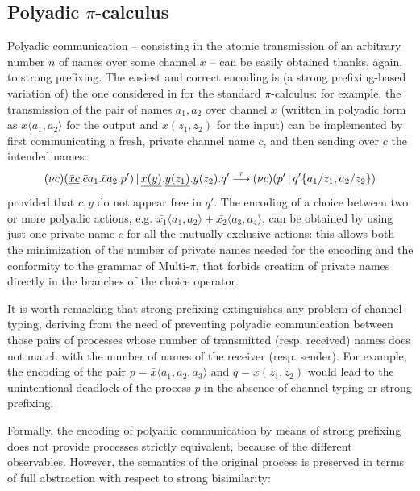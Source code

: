 \documentclass[submission,copyright,creativecommons]{eptcs}
\newcommand{\deriv}[1]{{\mbox{${\:\stackrel{#1}{\longrightarrow}\:}$}}}
\newcommand{\restr}[1]{\mbox{$({\bf\nu} #1)$}}
\newcommand{\para}{\mbox{$\,|\,$}}
\begin{document}
\subsection{Polyadic $\pi$-calculus}
Polyadic communication -- consisting in the atomic transmission of an arbitrary number $n$ of names over some channel $x$ --
can be easily obtained thanks, again, to strong prefixing. The easiest and correct encoding is (a strong prefixing-based variation of) 
the one considered in \cite{Mil91}
for the standard $\pi$-calculus: for example, the transmission of the pair of names $a_1, a_2$ over channel $x$ (written in polyadic
form as $\bar{x} \langle a_1,a_2 \rangle$ for the output and $x(z_1,z_2)$ for the input) can be implemented by first communicating a fresh, private channel name $c$, and then sending over $c$ the intended names:
\[ \restr{c} (\underline{\bar{x}c}.\underline{\bar{c}a_1}.\bar{c}a_2.p') \para
			 \underline{x(y)}.\underline{y(z_1)}.y(z_2).q' \deriv{\tau} \restr{c} (p' \para q'\{a_1/z_1,a_2/z_2\}) \]
provided that $c, y$ do not appear free in $q'$. The encoding of a choice between two or more polyadic actions, 
e.g. $\bar{x_1} \langle a_1,a_2 \rangle + \bar{x_2} \langle a_3,a_4 \rangle$, can be obtained by using just one 
private name $c$ for all the mutually exclusive actions: this allows both the minimization of the number 
of private names needed for the encoding and the conformity to the grammar of Multi-$\pi$, that forbids creation 
of private names directly in the branches of the choice operator.

It is worth remarking that strong prefixing extinguishes any problem of channel typing, deriving from the need of preventing polyadic 
communication between those pairs of processes whose number of transmitted (resp. received) names does not match with the number
of names of the receiver (resp. sender). For example, the encoding of the pair $p = \bar{x} \langle a_1,a_2,a_3 \rangle$ and $q = x(z_1,z_2)$
would lead to the unintentional deadlock of the process $p$ in the absence of channel typing or strong prefixing. 

Formally, the encoding of polyadic communication by means of strong prefixing does not provide processes strictly equivalent, because of the different observables. However, the semantics of the original process is preserved in terms of full abstraction with respect to strong bisimilarity:
\end{document}
